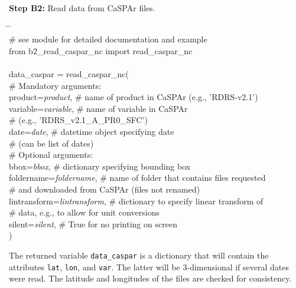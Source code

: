 \documentclass[10pt,a4paper,titlepage,parskip]{scrartcl}
\newenvironment{ttfont}{\fontfamily{\ttdefault}\selectfont}{\par}
\newcommand{\GRAU}[1]{\textcolor{ufzgray2}{#1}}
\begin{document}
\textbf{Step B2:} Read data from CaSPAr files.
\begin{framed}
	\vspace*{-1.2cm}
	\begin{ttfont}
		\begin{tabbing}
			\hspace{1.0cm} \= \hspace{5.2cm} \= \kill \\[4pt]
			\GRAU{\# see module for detailed documentation and example}\\
			from b2\_read\_caspar\_nc import read\_caspar\_nc\\
			\\
			data\_caspar = read\_caspar\_nc(\\
			\> \GRAU{\# Mandatory arguments:}\\
			\> product=\textit{product}, \> \GRAU{\# name of product in CaSPAr (e.g., 'RDRS-v2.1')}\\
			\> variable=\textit{variable}, \> \GRAU{\# name of variable in CaSPAr}\\
			\> \> \GRAU{\#  (e.g., 'RDRS\_v2.1\_A\_PR0\_SFC')}\\
			\> date=\textit{date}, \> \GRAU{\# datetime object specifying date}\\
			\> \> \GRAU{\#  (can be list of dates)}\\
			\> \GRAU{\# Optional arguments:}\\
			\> bbox=\textit{bbox}, \> \GRAU{\# dictionary specifying bounding box}\\
			\> foldername=\textit{foldername}, \> \GRAU{\# name of folder that contains files requested}\\
			\> \> \GRAU{\# and downloaded from CaSPAr (files not renamed)}\\
			\> lintransform=\textit{lintransform}, \> \GRAU{\# dictionary to specify linear transform of}\\
			\>  \> \GRAU{\# data, e.g., to allow for unit conversions}\\
			\> silent=\textit{silent}, \> \GRAU{\# True for no printing on screen}\\
			\> ) \> 
		\end{tabbing}
	\end{ttfont}
	\vspace*{-0.3cm}
\end{framed}
\vspace*{-0.3cm}
The returned variable \texttt{data\_caspar} is a dictionary that will contain the attributes \texttt{lat}, \texttt{lon}, and \texttt{var}. The latter will be 3-dimensional if several dates were read. The latitude and longitudes of the files are checked for consistency.
\end{document}
